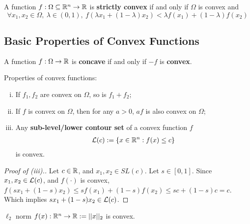 \documentclass{article}
\begin{document}
    \begin{definition}
        A function $f: \Omega \subseteq \mathbb{R}^n \to \mathbb{R}$ is \textbf{strictly convex} if and only if $\Omega$ is convex and 
        \begin{equation}
            \forall x_1, x_2 \in \Omega,\ \lambda \in (0, 1),\ f\left(\lambda x_1 + (1- \lambda) x_2 \right) < \lambda f(x_1) + (1 - \lambda) f(x_2)
        \end{equation}
    \end{definition}
    
    \subsection{Basic Properties of Convex Functions}
    
    \begin{definition}
        A function $f: \Omega \to \mathbb{R}$ is \textbf{concave} if and only if $-f$ is \textbf{convex}.
    \end{definition}
    
    \begin{proposition} Properties of convex functions:
        \begin{enumerate}[(i)]
            \item If $f_1, f_2$ are convex on $\Omega$, so is $f_1 + f_2$;
            \item If $f$ is convex on $\Omega$, then for any $a > 0$, $af$ is also convex on $\Omega$;
            \item Any \textbf{sub-level/lower contour set} of a convex function $f$ 
            \begin{align}
            	\mathcal{{L}}(c) := \{x \in \mathbb{R}^n: f(x) \leq c\}
            \end{align}
            is convex.
        \end{enumerate}
    \end{proposition}
    
    \begin{proof}[Proof of (iii).]
    	Let $c \in \mathbb{R}$, and $x_1 ,x_2 \in SL(c)$. Let $s \in [0, 1]$. Since $x_1, x_2 \in \mathcal{{L}}(c)$, and $f(\cdot)$ is convex, $f(s x_1 + (1-s) x_2) \leq s f(x_1) + (1-s) f(x_2) \leq s c + (1-s) c = c$. Which implies $s x_1 + (1-s) x_2 \in \mathcal{{L}}(c)$.
    \end{proof}
    
    \begin{example}
    	$\ell_2$ norm $f(x): \mathbb{R}^n \to \mathbb{R} := \vert \vert {x} \vert \vert_2$ is convex.
    \end{example}
    
\end{document}
